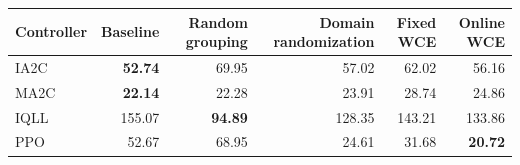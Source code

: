 \begin{tabular}{lrrrrr}
\hline
Controller & Baseline & Random grouping & Domain randomization & Fixed WCE & Online WCE \\
\hline
IA2C & \textbf{52.74} & 69.95 & 57.02 & 62.02 & 56.16 \\
MA2C & \textbf{22.14} & 22.28 & 23.91 & 28.74 & 24.86 \\
IQLL & 155.07 & \textbf{94.89} & 128.35 & 143.21 & 133.86 \\
PPO & 52.67 & 68.95 & 24.61 & 31.68 & \textbf{20.72} \\
\hline
\end{tabular}
